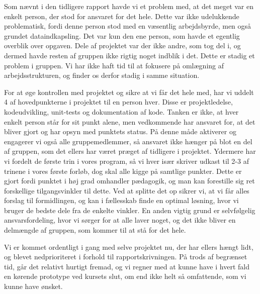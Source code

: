 \documentclass[10pt,a4paper,danish]{article}
\begin{document}
Som nævnt i den tidligere rapport havde vi et problem med, at det meget var en enkelt person, der stod for ansvaret for det hele. Dette var ikke udelukkende problematisk, fordi denne person stod med en væsentlig arbejdsbyrde, men også grundet dataindkapsling. Det var kun den ene person, som havde et egentlig overblik over opgaven. Dele af projektet var der ikke andre, som tog del i, og dermed havde resten af gruppen ikke rigtig noget indblik i det. Dette er stadig et problem i gruppen. Vi har ikke haft tid til at fokusere på omlægning af arbejdsstrukturen, og finder os derfor stadig i samme situation. 

For at øge kontrollen med projektet og sikre at vi får det hele med, har vi uddelt 4 af hovedpunkterne i projektet til en person hver. Disse er projektledelse, kodeudvikling, unit-tests og dokumentation af kode. Tanken er ikke, at hver enkelt person står for sit punkt alene, men vedkommende har ansvaret for, at det bliver gjort og har opsyn med punktets status. På denne måde aktiverer og engagerer vi også alle gruppemedlemmer, så ansvaret ikke hænger på blot en del af gruppen, som det ellers har været præget af tidligere i projektet. Ydermere har vi fordelt de første trin i vores program, så vi hver især skriver udkast til 2-3 af trinene i vores første forløb, dog skal alle kigge på samtlige punkter. Dette er gjort fordi punktet i høj grad omhandler pædagogik, og man kan forestille sig ret forskellige tilgangsvinkler til dette. Ved at splitte det op sikrer vi, at vi får alles forslag til formidlingen, og kan i fællesskab finde en optimal løsning, hvor vi bruger de bedste dele fra de enkelte vinkler. En anden vigtig grund er selvfølgelig ansvarsfordeling, hvor vi sørger for at alle laver noget, og det ikke bliver en delmængde af gruppen, som kommer til at stå for det hele.  

Vi er kommet ordentligt i gang med selve projektet nu, der har ellers hængt lidt, og blevet nedprioriteret i forhold til rapportskrivningen. På trods af begrænset tid, går det relativt hurtigt fremad, og vi regner med at kunne have i hvert fald en kørende prototype ved kursets slut, om end ikke helt så omfattende, som vi kunne have ønsket. 
\end{document}
